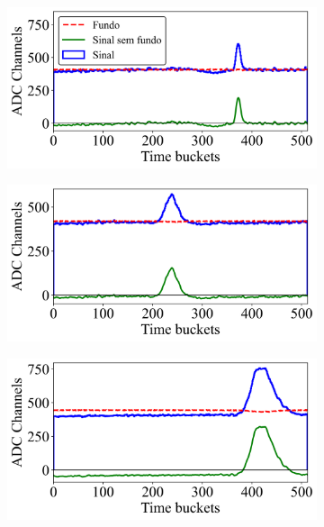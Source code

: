 \documentclass[a4paper,12pt,oneside]{book}
\begin{document}
\begin{figure}[H]
\centering
    \begin{subfigure}[c]{0.45\textwidth}
        \includegraphics[scale=0.42]{figs/bs_fourier_1.png}
        \caption{}
        \label{subfig:bs_fourier_1}
    \end{subfigure}%
    \hfill
    \begin{subfigure}[c]{0.45\textwidth}
        \includegraphics[scale=0.42]{figs/bs_fourier_2.png}
        \caption{}
        \label{subfig:bs_fourier_2}
    \end{subfigure}
    \begin{subfigure}[b]{0.45\textwidth}
        \centering
        \includegraphics[scale=0.42]{figs/bs_fourier_3.png}

\end{subfigure}
\end{figure}
\end{document}
